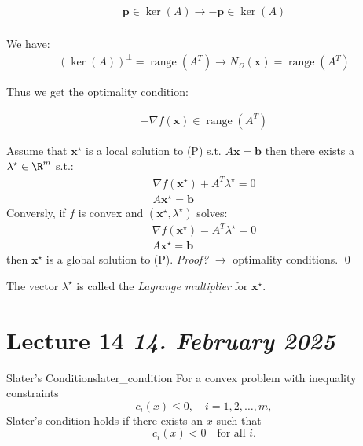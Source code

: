 \begin{remark}{}{}
	\begin{align*}
		\symbf{p} \in \ker(A) \rightarrow -\symbf{p} \in \ker(A) \\
	\end{align*}
\end{remark}

\begin{remark}{}{}
	We have:
	\begin{align*}
		\left(\ker(A)\right)^\perp = \operatorname{range}(A^T) \rightarrow N_{\Omega}(\symbf{x}) = \operatorname{range}(A^T)
	\end{align*}

	Thus we get the optimality condition:

	\begin{align*}
		+ \nabla f(\symbf{x}) \in \operatorname{range}(A^T)
	\end{align*}

\end{remark}

\begin{lemma}{}{}
	Assume that \(\symbf{x}^\star\) is a local solution to (P) s.t. \(A \symbf{x} = \symbf{b}\) then there exists a \(\lambda^\star \in \R^m\) s.t.:
	\begin{align*}
		\nabla f(\symbf{x}^\star) + A^T \lambda^\star = 0 \\
		A \symbf{x}^\star = \symbf{b}
	\end{align*}
	Conversly, if \(f\) is convex and \((\symbf{x}^\star, \lambda^\star)\) solves:
	\begin{align*}
		\nabla f(\symbf{x}^\star) = A^T \lambda^\star = 0 \\
		A \symbf{x}^\star = \symbf{b}
	\end{align*}
	then \(\symbf{x}^\star\) is a global solution to (P).
	\emph{Proof?} \(\rightarrow\) optimality conditions. \qed
\end{lemma}

The vector \(\lambda^\star\) is called the \emph{Lagrange multiplier} for \(\symbf{x}^\star\).

\section{Lecture 14 \emph{14. February 2025}}

\begin{definition}{Slater's Condition}{slater_condition}
	For a convex problem with inequality constraints
	\[
		c_i(x) \le 0,\quad i=1,2,\dots,m,
	\]
	Slater's condition holds if there exists an \(x\) such that
	\[
		c_i(x) < 0 \quad \text{for all } i.
	\]
\end{definition}

